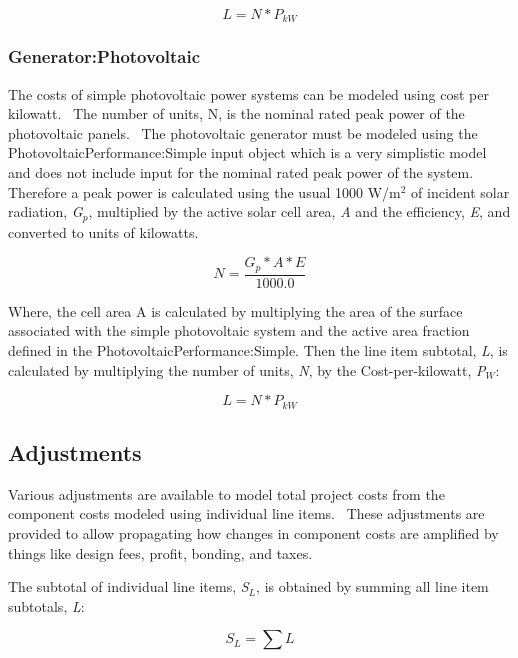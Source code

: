 \begin{equation}
L = N * {P_{kW}}
\end{equation}

\subsubsection{Generator:Photovoltaic}\label{generatorphotovoltaic}

The costs of simple photovoltaic power systems can be modeled using cost per kilowatt.~ The number of units, N, is the nominal rated peak power of the photovoltaic panels.~ The photovoltaic generator must be modeled using the PhotovoltaicPerformance:Simple input object which is a very simplistic model and does not include input for the nominal rated peak power of the system.~ Therefore a peak power is calculated using the usual 1000 W/m\(^{2}\) of incident solar radiation, \emph{G\(_{p}\)}, multiplied by the active solar cell area, \emph{A} and the efficiency, \emph{E}, and converted to units of kilowatts.

\begin{equation}
N = \frac{{{G_p} * A * E}}{{1000.0}}
\end{equation}

Where, the cell area A is calculated by multiplying the area of the surface associated with the simple photovoltaic system and the active area fraction defined in the PhotovoltaicPerformance:Simple. Then the line item subtotal, \emph{L}, is calculated by multiplying the number of units, \emph{N}, by the Cost-per-kilowatt, \emph{P\(_{W}\)}:

\begin{equation}
L = N * {P_{kW}}
\end{equation}

\subsection{Adjustments}\label{adjustments}

Various adjustments are available to model total project costs from the component costs modeled using individual line items.~ These adjustments are provided to allow propagating how changes in component costs are amplified by things like design fees, profit, bonding, and taxes.

The subtotal of individual line items, \emph{S\(_{L}\)}, is obtained by summing all line item subtotals, \emph{L}:

\begin{equation}
{S_L} = \sum L
\end{equation}

